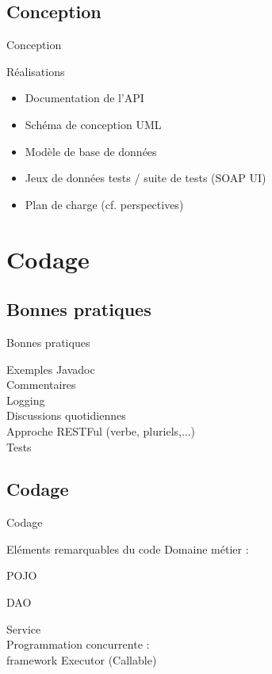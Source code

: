 \documentclass[utf8,compress]{beamer}
\begin{document}
\subsection{Conception}
\begin{frame}{Conception}
\begin{block}{Réalisations}
\begin{itemize}
\item Documentation de l'API
\item Schéma de conception UML
\item Modèle de base de données
\item Jeux de données tests / suite de tests (SOAP UI)
\item Plan de charge (cf. perspectives)
\end{itemize}
\end{block}
\end{frame}

\section{Codage}
\subsection{Bonnes pratiques}
\begin{frame}{Bonnes pratiques}
\begin{block}{Exemples}
	Javadoc\\
	Commentaires\\
	Logging\\
	Discussions quotidiennes\\
	Approche RESTFul (verbe, pluriels,...)\\
	Tests\\
\end{block}
\end{frame}
\subsection{Codage}
\begin{frame}{Codage}
\begin{block}{Eléments remarquables du code}
Domaine métier : \\
\item POJO 
\item DAO
\item Service\\

Programmation concurrente :\\
 \textrightarrow  	framework Executor (Callable)
\end{block}
\end{frame}
\end{document}
